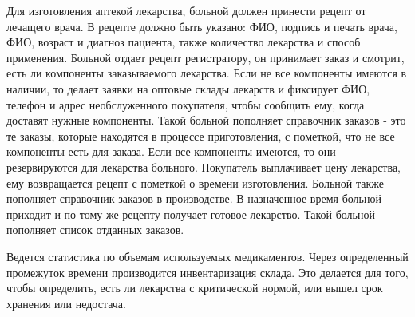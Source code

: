 \documentclass[a4paper]{article}
\begin{document}
			Для изготовления аптекой лекарства, больной должен принести рецепт от лечащего врача. В рецепте должно быть указано: ФИО, подпись и печать врача, ФИО, возраст и диагноз пациента, также количество лекарства и способ применения. Больной отдает рецепт регистратору, он принимает заказ и смотрит, есть ли компоненты заказываемого лекарства. Если не все компоненты имеются в наличии, то делает заявки на оптовые склады лекарств и фиксирует ФИО, телефон и адрес необслуженного покупателя, чтобы сообщить ему, когда доставят нужные компоненты. Такой больной пополняет справочник заказов - это те заказы, которые находятся в процессе приготовления, с пометкой, что не все компоненты есть для заказа. Если все компоненты имеются, то они резервируются для лекарства больного. Покупатель выплачивает цену лекарства, ему возвращается рецепт с пометкой о времени изготовления. Больной также пополняет справочник заказов в производстве. В назначенное время больной приходит и по тому же рецепту получает готовое лекарство. Такой больной пополняет список отданных заказов.
			
			Ведется статистика по объемам используемых медикаментов. Через определенный промежуток времени производится инвентаризация склада. Это делается для того, чтобы определить, есть ли лекарства с критической нормой, или вышел срок хранения или недостача.
\end{document}
